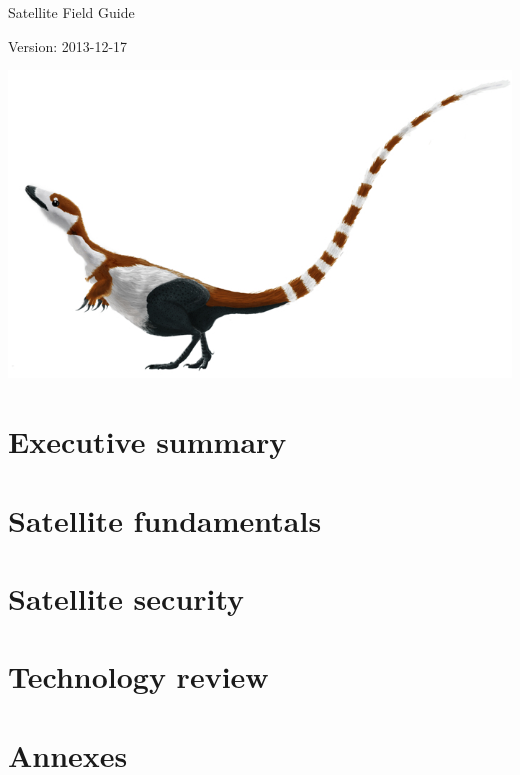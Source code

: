 \documentclass[oribibl]{scrbook}
\begin{document}
Satellite Field Guide

Version: 2013-12-17

\includegraphics{assets/images/cover.jpg}

\clearpage

\tableofcontents
\clearpage
\graphicspath{{./content/chapter_00_executive_summary/}}
\chapter{Executive summary}

\graphicspath{{./content/chapter_01_satellite_fundamentals/}}
\chapter{Satellite fundamentals}

\graphicspath{{./content/chapter_02_satellite_security/}}
\chapter{Satellite security}

\graphicspath{{./content/chapter_03_technology_review/}}
\chapter{Technology review}


\graphicspath{{./content/chapter_04_annexes/}}
\chapter{Annexes}

\end{document}
